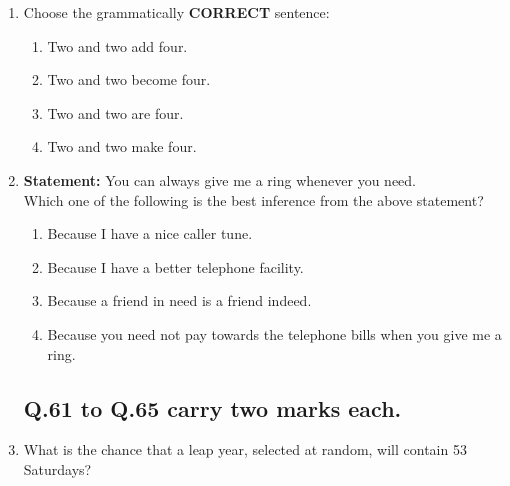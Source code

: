 \documentclass[journal,12pt,onecolumn]{IEEEtran}
\theoremstyle{remark}
\begin{document}
\begin{enumerate}
\begin{enumerate}
\end{enumerate}

\item Choose the grammatically \textbf{CORRECT} sentence:
\begin{enumerate}
\item Two and two add four.
\item Two and two become four.
\item Two and two are four.
\item Two and two make four.
\end{enumerate}

\item \textbf{Statement:} You can always give me a ring whenever you need.\\
Which one of the following is the best inference from the above statement?
\begin{enumerate}
\item Because I have a nice caller tune.
\item Because I have a better telephone facility.
\item Because a friend in need is a friend indeed.
\item Because you need not pay towards the telephone bills when you give me a ring.
\end{enumerate}


\subsection*{Q.61 to Q.65 carry two marks each.}


\item What is the chance that a leap year, selected at random, will contain 53 Saturdays?
\begin{enumerate}
\end{enumerate}


\end{enumerate}
\end{document}
